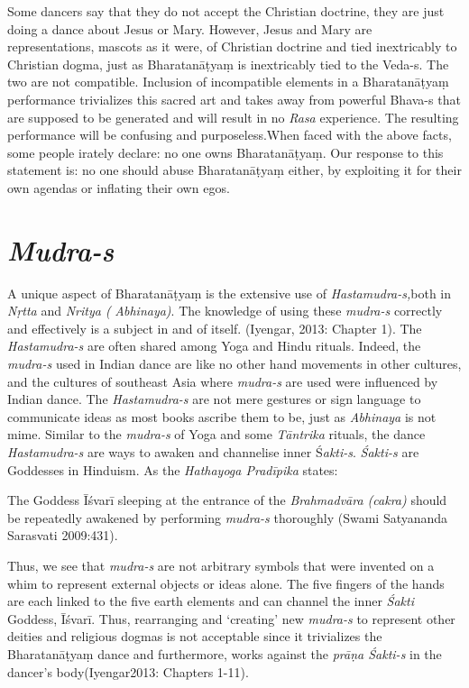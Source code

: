 Some dancers say that they do not accept the Christian doctrine, they are just doing a dance about Jesus or Mary. However, Jesus and Mary are representations, mascots as it were, of Christian doctrine and tied inextricably to Christian dogma, just as Bharatanāṭyaṃ is inextricably tied to the Veda-s. The two are not compatible. Inclusion of incompatible elements in a Bharatanāṭyaṃ performance trivializes this sacred art and takes away from powerful Bhava-s that are supposed to be generated and will result in no \textit{Rasa} experience. The resulting performance will be confusing and purposeless.When faced with the above facts, some people irately declare: no one owns Bharatanāṭyaṃ. Our response to this statement is: no one should abuse Bharatanāṭyaṃ either, by exploiting it for their own agendas or inflating their own egos.


\section*{\textit{Mudra-s}}

A unique aspect of Bharatanāṭyaṃ is the extensive use of \textit{Hastamudra-s,}\break both in \textit{Nṛtta }and \textit{Nritya (} \textit{Abhinaya)}. The knowledge of using these \textit{mudra-s }correctly and effectively is a subject in and of itself. (Iyengar, 2013: Chapter 1). The \textit{Hastamudra-s} are often shared among Yoga and Hindu rituals. Indeed, the \textit{mudra-s} used in Indian dance are like no other hand movements in other cultures, and the cultures of southeast Asia where \textit{mudra-s }are used were influenced by Indian dance. The \textit{Hastamudra-s }are not mere gestures or sign language to communicate ideas as most books ascribe them to be, just as \textit{Abhinaya }is not mime. Similar to the \textit{mudra-s }of Yoga and some \textit{Tāntrika} rituals, the dance \textit{Hastamudra-s} are ways to awaken and channelise inner Ś\textit{akti-s}. \textit{Śakti-s} are Goddesses in Hinduism. As the \textit{Hathayoga Pradīpika} states:

The Goddess Īśvarī sleeping at the entrance of the \textit{Brahmadvāra (cakra)} should be repeatedly awakened by performing \textit{mudra-s} thoroughly (Swami Satyananda Sarasvati 2009:431).

Thus, we see that \textit{mudra-s }are not arbitrary symbols that were invented on a whim to represent external objects or ideas alone. The five fingers of the hands are each linked to the five earth elements and can channel the inner \textit{Śakti} Goddess, Īśvarī. Thus, rearranging and ‘creating’ new \textit{mudra-s }to represent other deities and religious dogmas is not acceptable since it trivializes the Bharatanāṭyaṃ dance and furthermore, works against the \textit{prāṇa Śakti-s} in the dancer’s body(Iyengar2013: Chapters 1-11).

